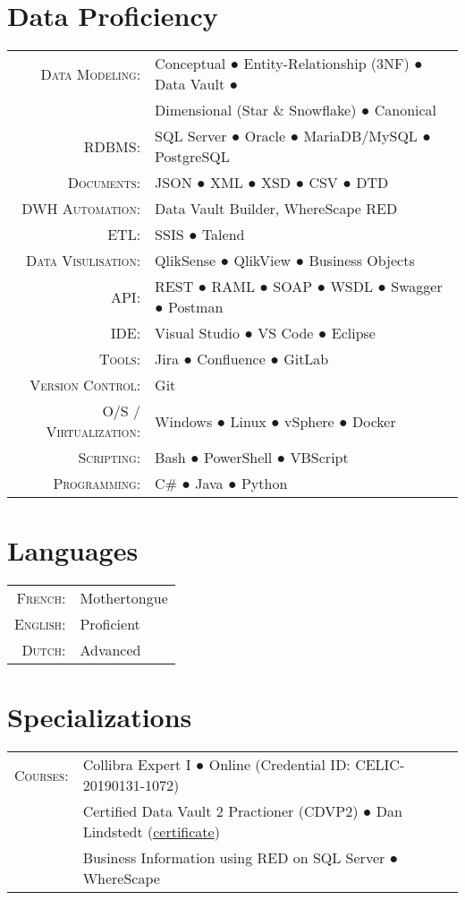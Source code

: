 \documentclass[a4paper,10pt]{article}
\begin{document}
\section{Data Proficiency}
\begin{tabular}{rl}
  \textsc{Data Modeling:}& Conceptual ● Entity-Relationship (3NF) ● Data Vault ● \\
  &Dimensional (Star \& Snowflake) ● Canonical \\
  \textsc{RDBMS:}& SQL Server ● Oracle ● MariaDB/MySQL ● PostgreSQL \\
  \textsc{Documents:}& JSON ● XML ● XSD ● CSV ● DTD \\
  \textsc{DWH Automation:}& Data Vault Builder, WhereScape RED \\
  \textsc{ETL:}& SSIS ● Talend\\
  \textsc{Data Visulisation:}& QlikSense ● QlikView ● Business Objects \\
  \textsc{API:}& REST ● RAML ● SOAP ● WSDL ● Swagger ● Postman\\
  \textsc{IDE:}& Visual Studio ● VS Code ● Eclipse\\
  \textsc{Tools:}& Jira ● Confluence ● GitLab\\
  \textsc{Version Control:}& Git \\
  \textsc{O/S / Virtualization:}& Windows ● Linux ● vSphere ● Docker\\
  \textsc{Scripting}:&Bash ● PowerShell ● VBScript \\
  \textsc{Programming}:&C\# ● Java ● Python\\
\end{tabular}

\section{Languages}
\begin{tabular}{rl}
  \textsc{French:}& Mothertongue\\
  \textsc{English:}& Proficient\\
  \textsc{Dutch:}& Advanced\\
\end{tabular}

\section{Specializations}
\begin{tabular}{rl}
  \textsc{Courses:}
  &Collibra Expert I ● Online (Credential ID: CELIC-20190131-1072)\\
  &Certified Data Vault 2 Practioner (CDVP2) ● Dan Lindstedt (\href{https://max.pow.is/assets/5_2_12900_1435331244_CDVP2_Certificate.pdf}{certificate})\\
  &Business Information using RED on SQL Server ● WhereScape
\end{tabular}
\end{document}
